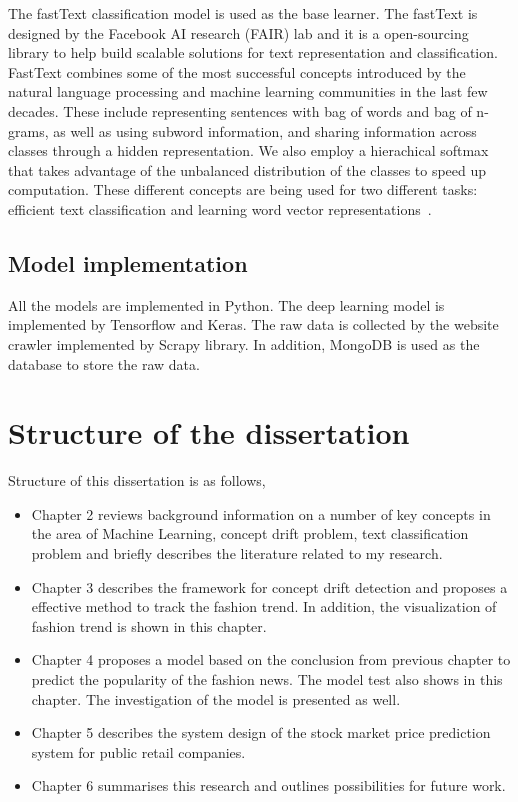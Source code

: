 The fastText classification model is used as the base learner. The fastText is designed by the Facebook AI research (FAIR) lab and it is a open-sourcing library to help build scalable solutions for text representation and classification. FastText combines some of the most successful concepts introduced by the natural language processing and machine learning communities in the last few decades. These include representing sentences with bag of words and bag of n-grams, as well as using subword information, and sharing information across classes through a hidden representation. We also employ a hierachical softmax that takes advantage of the unbalanced distribution of the classes to speed up computation. These different concepts are being used for two different tasks: efficient text classification and learning word vector representations~\cite{joulin2016fasttext}.

\subsection{Model implementation}
All the models are implemented in Python. The deep learning model is implemented by Tensorflow and Keras. The raw data is collected by the website crawler implemented by Scrapy library. In addition, MongoDB is used as the database to store the raw data. 



\section{Structure of the dissertation}
Structure of this dissertation is as follows,

\begin{itemize}
	\item Chapter 2 reviews background information on a number of key concepts in the area of Machine Learning, concept drift problem, text classification problem and briefly describes the literature related to my research.

	\item Chapter 3 describes the framework for concept drift detection and proposes a effective method to track the fashion trend. In addition, the visualization of fashion trend is shown in this chapter.

	\item Chapter 4 proposes a model based on the conclusion from previous chapter to predict the popularity of the fashion news. The model test also shows in this chapter. The investigation of the model is presented as well.

	\item Chapter 5 describes the system design of the  stock market price prediction system for public retail companies.

	\item Chapter 6 summarises this research and outlines possibilities for future work.


\end{itemize}

